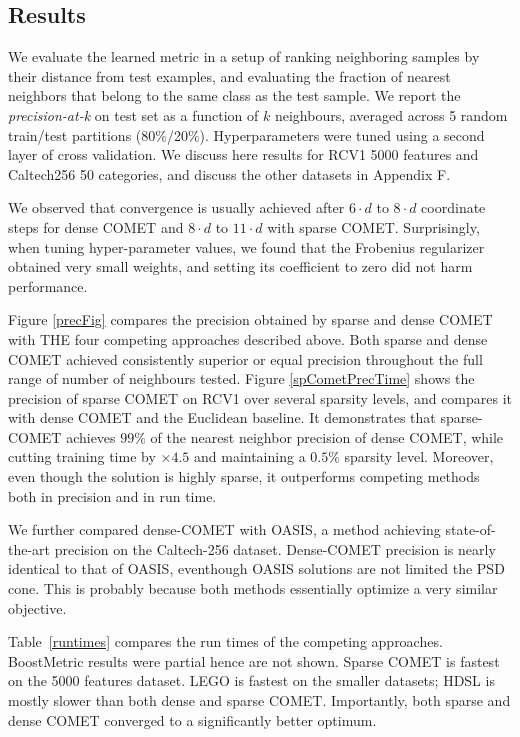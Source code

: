 \documentclass[twoside,11pt]{article}
\newcommand{\ignore}[1]{}
\newcommand{\tabref}[1]{Table~\ref{#1}}
\begin{document}
\subsection{Results}\vskip -5pt
We evaluate the learned metric in a setup of ranking neighboring samples by their distance from test examples, and evaluating the fraction of nearest neighbors that belong to the same class as the test sample. We report the \textit{precision-at-k} on test set as a function of $k$ neighbours, averaged across 5 random train/test partitions (80\%/20\%). Hyperparameters were tuned using a second layer of cross validation. We discuss here results for RCV1 5000 features and Caltech256 50 categories, and discuss the other datasets in Appendix F.
\ignore{Figure \ref{cometConvergeFig} shows the \textit{precision-at-k} over the test sets as it progresses during learning. 
}
We observed that convergence is usually achieved after $6 \cdot d$ to $8 \cdot d$ coordinate steps for dense COMET and $8 \cdot d$ to $11 \cdot d$ with sparse COMET.
Surprisingly, when tuning hyper-parameter values, we found that the Frobenius regularizer obtained very small weights, and setting its coefficient to zero did not harm performance. 

Figure \ref{precFig} compares the precision obtained by sparse and dense COMET with THE four competing approaches described above. Both sparse and dense COMET achieved consistently superior or equal precision throughout the full range of number of neighbours tested.
Figure \ref{spCometPrecTime} shows the precision of sparse COMET on RCV1 over several sparsity levels, and compares it with dense COMET and the Euclidean baseline. It demonstrates that sparse-COMET achieves $99\%$ of the nearest neighbor precision of dense COMET, while cutting training time by $\times4.5$ and maintaining a $0.5\%$ sparsity level. Moreover, even though the solution is highly sparse, it outperforms competing methods both in precision and in run time.

We further compared dense-COMET with OASIS, a method achieving state-of-the-art precision on the Caltech-256 dataset. Dense-COMET precision is nearly identical to that of OASIS, eventhough OASIS solutions are not limited the PSD cone. This is probably because both methods essentially optimize a very similar objective.

\tabref{runtimes} compares the run times of the competing approaches. BoostMetric results were partial hence are not shown. Sparse COMET is fastest on the 5000 features dataset. LEGO is fastest on the smaller datasets; HDSL is mostly slower than both dense and sparse COMET. Importantly, both sparse and dense COMET converged to a significantly better optimum.
\end{document}
